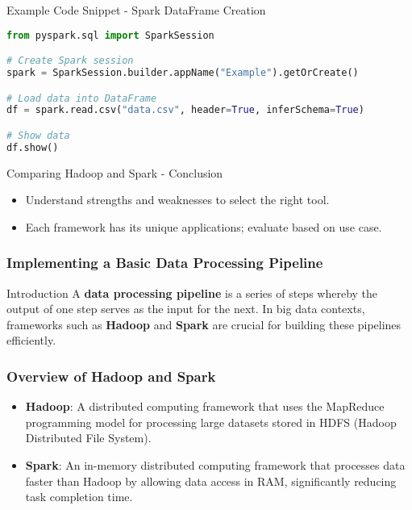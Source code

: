 \documentclass[aspectratio=169]{beamer}
\begin{document}
\begin{frame}[fragile]{Example Code Snippet - Spark DataFrame Creation}
    \begin{lstlisting}[language=Python]
from pyspark.sql import SparkSession

# Create Spark session
spark = SparkSession.builder.appName("Example").getOrCreate()

# Load data into DataFrame
df = spark.read.csv("data.csv", header=True, inferSchema=True)

# Show data
df.show()
    \end{lstlisting}
\end{frame}

\begin{frame}[fragile]{Comparing Hadoop and Spark - Conclusion}
    \begin{itemize}
        \item Understand strengths and weaknesses to select the right tool.
        \item Each framework has its unique applications; evaluate based on use case.
    \end{itemize}
\end{frame}

\begin{frame}[fragile]
    \frametitle{Implementing a Basic Data Processing Pipeline}
    \begin{block}{Introduction}
        A \textbf{data processing pipeline} is a series of steps whereby the output of one step serves as the input for the next. In big data contexts, frameworks such as \textbf{Hadoop} and \textbf{Spark} are crucial for building these pipelines efficiently.
    \end{block}
\end{frame}

\begin{frame}[fragile]
    \frametitle{Overview of Hadoop and Spark}
    \begin{itemize}
        \item \textbf{Hadoop}: A distributed computing framework that uses the MapReduce programming model for processing large datasets stored in HDFS (Hadoop Distributed File System).
        
        \item \textbf{Spark}: An in-memory distributed computing framework that processes data faster than Hadoop by allowing data access in RAM, significantly reducing task completion time.
    \end{itemize}
\end{frame}
\end{document}
